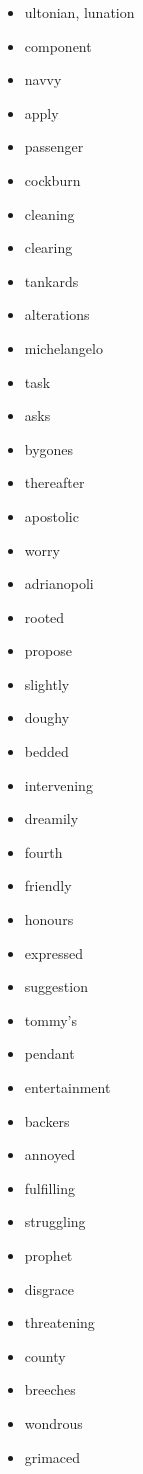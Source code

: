\documentclass{article}
\begin{document}
\begin{itemize}
    \item ultonian, lunation
    \item component
    \item navvy
    \item apply
    \item passenger
    \item cockburn
    \item cleaning
    \item clearing
    \item tankards
    \item alterations
    \item michelangelo
    \item task
    \item asks
    \item bygones
    \item thereafter
    \item apostolic
    \item worry
    \item adrianopoli
    \item rooted
    \item propose
    \item slightly
    \item doughy
    \item bedded
    \item intervening
    \item dreamily
    \item fourth
    \item friendly
    \item honours
    \item expressed
    \item suggestion
    \item tommy's
    \item pendant
    \item entertainment
    \item backers
    \item annoyed
    \item fulfilling
    \item struggling
    \item prophet
    \item disgrace
    \item threatening
    \item county
    \item breeches
    \item wondrous
    \item grimaced

\end{itemize}
\end{document}
